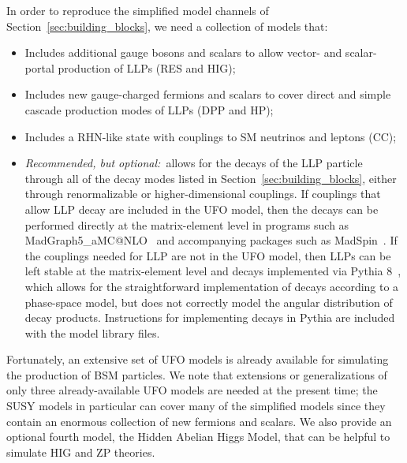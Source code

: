 In order to reproduce the simplified model channels of Section~\ref{sec:building_blocks}, we need a collection of models that:
%
\begin{itemize}
\item Includes additional gauge bosons and scalars to allow vector- and scalar-portal production of LLPs (RES and HIG);
\item Includes new gauge-charged fermions and scalars to cover direct and simple cascade production modes of LLPs (DPP and HP); 
\item Includes a RHN-like state with couplings to SM neutrinos and leptons (CC);
\item \emph{Recommended, but optional:}~allows for the decays of the LLP particle through all of the decay modes listed in Section~\ref{sec:building_blocks}, either through renormalizable or higher-dimensional couplings.
If couplings that allow LLP decay are included in the UFO model, then the decays can be performed directly at the matrix-element level in programs such as MadGraph5\_aMC@NLO~\cite{Alwall:2014hca} and accompanying packages such as MadSpin~\cite{Artoisenet:2012st}.
If the couplings needed for LLP are not in the UFO model, then LLPs can be left stable at the matrix-element level and decays implemented via Pythia 8~\cite{Sjostrand:2007gs,Sjostrand:2014zea}, which allows for the straightforward implementation of decays according to a phase-space model, but does not correctly model the angular distribution of decay products.
Instructions for implementing decays in Pythia are included with the model library files.
\end{itemize}

Fortunately, an extensive set of UFO models is already available for simulating the production of BSM particles.
We note that extensions or generalizations of only three already-available UFO models are needed at the present time; the SUSY models
in particular can cover many of the simplified models since they contain an enormous collection of new fermions and scalars.
We also provide an optional
fourth model, the Hidden Abelian Higgs Model, that can be helpful to simulate HIG and ZP theories.

